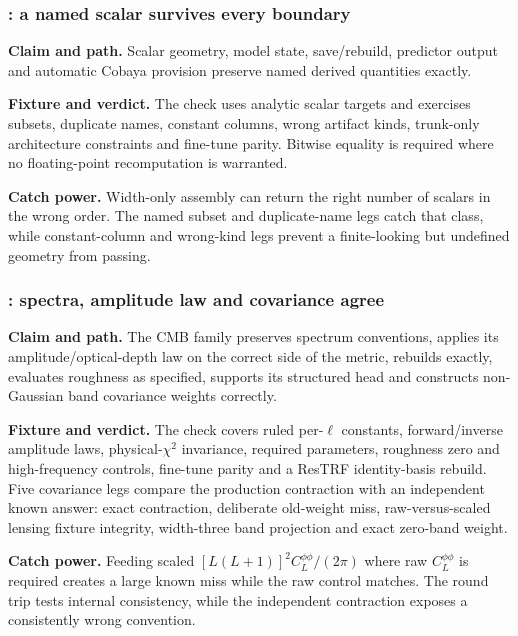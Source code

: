 \subsubsection{: a named scalar survives every boundary}

\textbf{Claim and path.}  Scalar geometry, model state, save/rebuild, predictor
output and automatic Cobaya provision preserve named derived quantities
exactly.

\textbf{Fixture and verdict.}  The check uses analytic scalar targets and
exercises subsets, duplicate names, constant columns, wrong artifact kinds,
trunk-only architecture constraints and fine-tune parity.  Bitwise equality
is required where no floating-point recomputation is warranted.

\textbf{Catch power.}  Width-only assembly can return the right number of
scalars in the wrong order.  The named subset and duplicate-name legs catch
that class, while constant-column and wrong-kind legs prevent a finite-looking
but undefined geometry from passing.

\subsubsection{: spectra, amplitude law and covariance agree}

\textbf{Claim and path.}  The CMB family preserves spectrum conventions,
applies its amplitude/optical-depth law on the correct side of the metric,
rebuilds exactly, evaluates roughness as specified, supports its structured
head and constructs non-Gaussian band covariance weights correctly.

\textbf{Fixture and verdict.}  The check covers ruled per-\(\ell\) constants,
forward/inverse amplitude laws, physical-\(\chi^2\) invariance, required
parameters, roughness zero and high-frequency controls, fine-tune parity and
a ResTRF identity-basis rebuild.  Five covariance legs compare the production
contraction with an independent known answer: exact contraction, deliberate
old-weight miss, raw-versus-scaled lensing fixture integrity, width-three band
projection and exact zero-band weight.

\textbf{Catch power.}  Feeding scaled
\([L(L+1)]^2C_L^{\phi\phi}/(2\pi)\) where raw
\(C_L^{\phi\phi}\) is required creates a large known miss while the raw
control matches.  The round trip tests internal consistency, while the
independent contraction exposes a consistently wrong convention.

